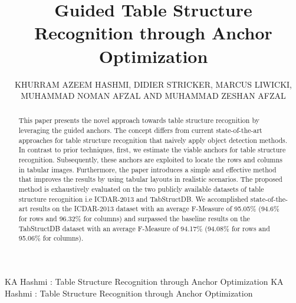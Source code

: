 \documentclass{ieeeaccess}
\begin{document}
\title{Guided Table Structure Recognition through Anchor Optimization}
\author{\uppercase{Khurram Azeem Hashmi},     \uppercase{Didier Stricker, Marcus Liwicki, Muhammad Noman Afzal and Muhammad Zeshan Afzal}
}

\address[1]{German Research Center for Artificial Intelligence, 67663 Kaiserslautern, Germany}
\address[2]{Department of Computer Science, University of Kaiserslautern, 67663 Kaiserslautern, Germany}
\address[3]{Mindgrage, University of Kaiserslautern, 67663 Kaiserslautern, Germany}
\address[4]{Luleå University of Technology, A3570 Luleå, Sweden}
\address[5]{Bilojix Soft Technologies, Bahawalpur. Pakistan} 


\markboth
{KA Hashmi \headeretal: Table Structure Recognition through Anchor Optimization}
{KA Hashmi \headeretal: Table Structure Recognition through Anchor Optimization}


\begin{abstract}


This paper presents the novel approach towards table structure recognition by leveraging the guided anchors. The concept differs from current state-of-the-art approaches for table structure recognition that naively apply object detection methods. In contrast to prior techniques, first, we estimate the viable anchors for table structure recognition. Subsequently, these anchors are exploited to locate the rows and columns in tabular images. Furthermore, the paper introduces a simple and effective method that improves the results by using tabular layouts in realistic scenarios. The proposed method is exhaustively evaluated on the two publicly available datasets of table structure recognition i.e ICDAR-2013 and TabStructDB. We accomplished state-of-the-art results on the ICDAR-2013 dataset with an average F-Measure of 95.05$\%$ (94.6$\%$ for rows and 96.32$\%$ for columns) and surpassed the baseline results on the TabStructDB dataset with an average F-Measure of 94.17$\%$ (94.08$\%$ for rows and 95.06$\%$ for columns).









 


\end{abstract}
\end{document}
